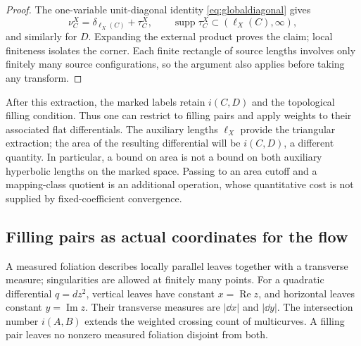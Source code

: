 \begin{proof}
The one-variable unit-diagonal identity
\eqref{eq:globaldiagonal} gives
\[
 \nu_C^X=\delta_{\ell_X(C)}+\tau_C^X,
 \qquad \operatorname{supp}\tau_C^X
        \subset(\ell_X(C),\infty),
\]
and similarly for $D$.  Expanding the external product proves the
claim; local finiteness isolates the corner.  Each finite rectangle
of source lengths involves only finitely many source configurations,
so the argument also applies before taking any transform.
\end{proof}

After this extraction, the marked labels retain $i(C,D)$ and the
topological filling condition.  Thus one can restrict to filling
pairs and apply weights to their associated flat differentials.
The auxiliary lengths $\ell_X$ provide the triangular extraction;
the area of the resulting differential will be $i(C,D)$, a different
quantity.  In particular, a bound on area is not a bound on both
auxiliary hyperbolic lengths on the marked space.  Passing to an
area cutoff and a mapping-class quotient is an additional operation,
whose quantitative cost is not supplied by fixed-coefficient
convergence.


\subsection{Filling pairs as actual coordinates for the flow}
\label{subsec:pairgeometry}

A measured foliation describes locally parallel leaves together
with a transverse measure; singularities are allowed at finitely
many points. For a quadratic differential $q=dz^2$, vertical
leaves have constant $x=\operatorname{Re}z$, and horizontal
leaves constant $y=\operatorname{Im}z$. Their transverse measures
are $|\dd x|$ and $|\dd y|$. The intersection number $i(A,B)$
extends the weighted crossing count of multicurves. A filling
pair leaves no nonzero measured foliation disjoint from both.

